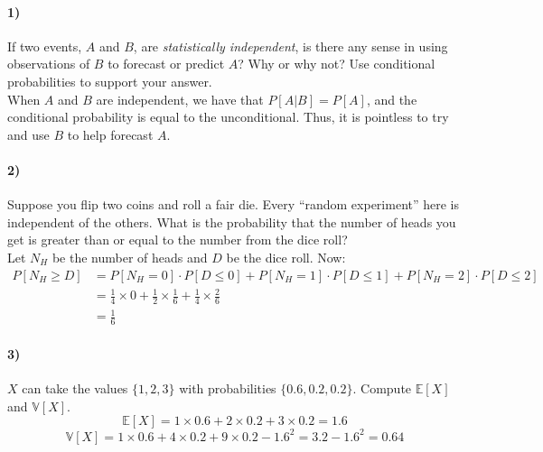 \documentclass[12pt]{article}
\newcommand\BB{\mathbb}
\newcommand\EE{\mathbb{E}}
\numberwithin{equation}{section}
\numberwithin{figure}{section}
\numberwithin{table}{section}
\begin{document}
\paragraph{1)} If two events, $A$ and $B$, are \emph{statistically independent}, is there any sense in using observations of $B$ to forecast or predict $A$? Why or why not? Use conditional probabilities to support your answer. \\
{\color{blue} When $A$ and $B$ are independent, we have that $P[A|B] = P[A]$, and the conditional probability is equal to the unconditional. Thus, it is pointless to try and use $B$ to help forecast $A$.}

\paragraph{2)} Suppose you flip two coins and roll a fair die. Every ``random experiment'' here is independent of the others. What is the probability that the number of heads you get is greater than or equal to the number from the dice roll? \\
{\color{blue} Let $N_{H}$ be the number of heads and $D$ be the dice roll. Now:
\begin{align*}
P[N_{H}\geq D] &= P[N_{H}=0]\cdot P[D\leq0] + P[N_{H}=1]\cdot P[D\leq1] + P[N_{H}=2]\cdot P[D\leq2] \\
&= \frac{1}{4}\times0 + \frac{1}{2}\times\frac{1}{6} + \frac{1}{4}\times\frac{2}{6} \\
&= \frac{1}{6}
\end{align*}
}

\paragraph{3)} $X$ can take the values $\{1,2,3\}$ with probabilities $\{0.6,0.2,0.2\}$. Compute $\EE[X]$ and $\BB{V}[X]$.
{\color{blue}
\[\EE[X] = 1\times 0.6 + 2\times 0.2 + 3\times0.2 = 1.6\]
\[\BB{V}[X] = 1\times0.6 + 4\times 0.2 + 9\times 0.2 - 1.6^2 = 3.2-1.6^2 = 0.64 \]}
\end{document}
